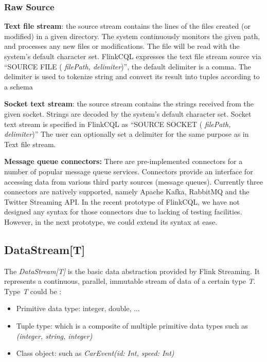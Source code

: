 \subsubsection*{Raw Source}


\textbf{Text file stream}: the source stream contains the lines of the files created (or modified) in a given directory. The system continuously monitors the given path, and processes any new files or modifications. The file will be read with the system’s default character set. FlinkCQL expresses the text file stream source via ``SOURCE FILE ( \textit{filePath, delimiter})'', the default delimiter is a comma. The delimiter is used to tokenize string and convert its result into tuples according to a schema


\textbf{Socket text stream}: the source stream contains the strings received from the given socket. Strings are decoded by the system’s default character set. Socket text stream is specified in FlinkCQL as ``SOURCE SOCKET ( \textit{filePath, delimiter})''
The user can optionally set a delimiter for the same purpose as in Text file stream.


\textbf{Message queue connectors:} There are pre-implemented connectors for a number of popular message queue services. Connectors provide an interface for accessing data from various third party sources (message queues). Currently three connectors are natively supported, namely Apache Kafka, RabbitMQ and the Twitter Streaming API. In the recent prototype of FlinkCQL, we have not designed any syntax for those connectors due to lacking of testing facilities. However, in the next prototype, we could extend its syntax at ease.

\subsection*{DataStream[T]}
The \textit{DataStream[T]} is the basic data abstraction provided by Flink Streaming. It represents a continuous, parallel, immutable stream of data of a certain type \textit{T}. Type \textit{T} could be :
\begin{itemize}
\item Primitive data type: integer, double, ...
\item Tuple type: which is a composite of multiple primitive data types such as \textit{(integer, string, integer)}
\item Class object: such as \textit{CarEvent(id: Int, speed: Int)}
\end{itemize} 

